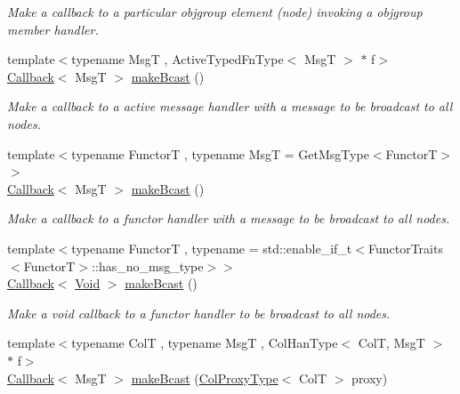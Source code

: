 \begin{DoxyCompactItemize}
\begin{DoxyCompactList}\small\item\em Make a callback to a particular objgroup element (node) invoking a objgroup member handler. \end{DoxyCompactList}\item 
{\footnotesize template$<$typename MsgT , Active\+Typed\+Fn\+Type$<$ Msg\+T $>$ $\ast$ f$>$ }\\\hyperlink{namespacevt_a36db99df4c973d48b1118a293fff533f}{Callback}$<$ MsgT $>$ \hyperlink{structvt_1_1pipe_1_1_pipe_manager_a2ea6bd5ea3e001662681b1e5a1971e9d}{make\+Bcast} ()
\begin{DoxyCompactList}\small\item\em Make a callback to a active message handler with a message to be broadcast to all nodes. \end{DoxyCompactList}\item 
{\footnotesize template$<$typename FunctorT , typename MsgT  = Get\+Msg\+Type$<$\+Functor\+T$>$$>$ }\\\hyperlink{namespacevt_a36db99df4c973d48b1118a293fff533f}{Callback}$<$ MsgT $>$ \hyperlink{structvt_1_1pipe_1_1_pipe_manager_a50e15818da3bc48ac9f129fbd30c3e31}{make\+Bcast} ()
\begin{DoxyCompactList}\small\item\em Make a callback to a functor handler with a message to be broadcast to all nodes. \end{DoxyCompactList}\item 
{\footnotesize template$<$typename FunctorT , typename  = std\+::enable\+\_\+if\+\_\+t$<$\+Functor\+Traits$<$\+Functor\+T$>$\+::has\+\_\+no\+\_\+msg\+\_\+type$>$$>$ }\\\hyperlink{namespacevt_a36db99df4c973d48b1118a293fff533f}{Callback}$<$ \hyperlink{structvt_1_1pipe_1_1_pipe_manager_ab720c2580ecfd3ab36e49aeaaff64cc6}{Void} $>$ \hyperlink{structvt_1_1pipe_1_1_pipe_manager_a42e6860c842d31411b7d90154a0c6a17}{make\+Bcast} ()
\begin{DoxyCompactList}\small\item\em Make a void callback to a functor handler to be broadcast to all nodes. \end{DoxyCompactList}\item 
{\footnotesize template$<$typename ColT , typename MsgT , Col\+Han\+Type$<$ Col\+T, Msg\+T $>$ $\ast$ f$>$ }\\\hyperlink{namespacevt_a36db99df4c973d48b1118a293fff533f}{Callback}$<$ MsgT $>$ \hyperlink{structvt_1_1pipe_1_1_pipe_manager_a1fefc503b58bbdf791e76a6c8f339df6}{make\+Bcast} (\hyperlink{structvt_1_1pipe_1_1_pipe_manager_t_l_af56c58cad882496e35f01227d4da3898}{Col\+Proxy\+Type}$<$ ColT $>$ proxy)

\end{DoxyCompactItemize}
